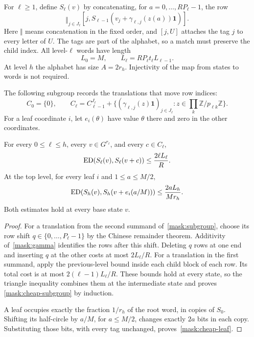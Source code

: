 For $\ell\geq1$, define $S_\ell(v)$ by concatenating, for
$a=0,\ldots,RP_\ell-1$, the row
\begin{equation}\label{mask:word}
 \mathop{\Vert}_{j\in J_\ell}
 [j,S_{\ell-1}(v_j+\gamma_{\ell,j}(z(a))\mathbf1)].
\end{equation}
Here $\Vert$ means concatenation in the fixed order, and $[j,U]$ attaches
the tag $j$ to every letter of $U$. The tags are part of the alphabet, so a
match must preserve the child index. All level-$\ell$ words have length
\begin{equation}\label{mask:length}
 L_0=M,\qquad L_\ell=RP_\ell t_\ell L_{\ell-1}.
\end{equation}
At level $h$ the alphabet has size $A=2r_h$. Injectivity of the map from
states to words is not required.

The following subgroup records the translations that move row indices:
\begin{equation}\label{mask:subgroup}
 C_0=\{0\},\qquad
 C_\ell=C_{\ell-1}^{J_\ell}+
 \{(\gamma_{\ell,j}(z)\mathbf1)_{j\in J_\ell}:
        z\in\textstyle\prod_k\mathbb Z/p_{\ell k}\mathbb Z\}.
\end{equation}
For a leaf coordinate $i$, let $e_i(\theta)$ have value $\theta$ there
and zero in the other coordinates.

\begin{lemma}\label{mask:cheap}
For every $0\leq\ell\leq h$, every $v\in G^{r_\ell}$, and every
$c\in C_\ell$,
\begin{equation}\label{mask:cheap-subgroup}
 \operatorname{ED}(S_\ell(v),S_\ell(v+c))\leq\frac{2\ell L_\ell}{R}.
\end{equation}
At the top level, for every leaf $i$ and $1\leq a\leq M/2$,
\begin{equation}\label{mask:cheap-leaf}
 \operatorname{ED}(S_h(v),S_h(v+e_i(a/M)))\leq\frac{2aL_h}{Mr_h}.
\end{equation}
Both estimates hold at every base state $v$.
\end{lemma}
\begin{proof}
For a translation from the second summand of~\eqref{mask:subgroup}, choose
its row shift $q\in\{0,\ldots,P_\ell-1\}$ by the Chinese remainder
theorem. Additivity of~\eqref{mask:gamma} identifies the rows after this
shift. Deleting $q$ rows at one end and inserting $q$ at the other costs
at most $2L_\ell/R$. For a translation in the first summand, apply the
previous-level bound inside each child block of each row. Its total cost is
at most $2(\ell-1)L_\ell/R$. These bounds hold at every state, so the
triangle inequality combines them at the intermediate state and proves
\eqref{mask:cheap-subgroup} by induction.

A leaf occupies exactly the fraction $1/r_h$ of the root word, in copies of
$S_0$. Shifting its half-circle by $a/M$, for $a\leq M/2$, changes exactly
$2a$ bits in each copy. Substituting those bits, with every tag unchanged,
proves~\eqref{mask:cheap-leaf}.
\end{proof}

